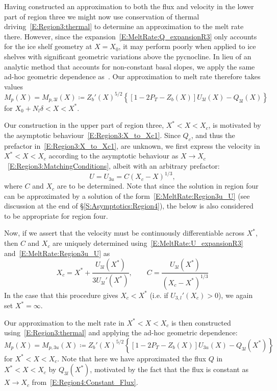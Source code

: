 \documentclass[openacc]{rsproca_new}%
\newcommand{\lt}{\delta} %
\newcommand{\Pt}{\textit{P}_T}
\begin{document}
Having constructed an approximation to both the flux and velocity in the lower part of region three we might now use conservation of thermal driving~\eqref{E:Region3:thermal} to determine an approximation to the melt rate there. However, since the expansion~\eqref{E:MeltRate:Q_expansionR3} only accounts for the ice shelf geometry at $X = X_0$, it may perform poorly when applied to ice shelves with significant geometric variations above the pycnocline. In lieu of an analytic method that accounts for non-constant basal slopes, we apply the same ad-hoc geometric dependence as~\citet{Lazeroms2018TheCryo}. Our approximation to melt rate therefore takes values
\begin{equation}\label{E:MeltRate:regions3_l}
M_{p}(X) = M_{p,3l}(X)\coloneqq Z_b'(X)^{5/2}\left\{\left[1  - 2\Pt -  Z_b(X)\right] U_{3l}(X) - Q_{3l}(X)\right\}
\end{equation}
for $X_0 + N_l \lt < X < X^*$.

Our construction in the upper part of region three, $X^* < X < X_c$, is motivated by the asymptotic behaviour~\eqref{E:Region3:X_to_Xc1}. Since $Q_c$, and thus the prefactor in~\eqref{E:Region3:X_to_Xc1}, are unknown, we first express the velocity in $X^* < X < X_c$ according to the asymptotic behaviour as $X\to X_c$~\eqref{E:Region3:MatchingConditions}, albeit with an arbitrary prefactor:
\begin{equation}\label{E:MeltRate:Region3u_U}
U =U_{3u} =  C (X_c - X)^{1/3},
\end{equation} 
where $C$ and $X_c$ are to be determined. Note that since the solution in region four can be approximated by a solution of the form~\eqref{E:MeltRate:Region3u_U} (see discussion at the end of \S\ref{S:Asymptotics:Region4}), the below is also considered to be appropriate for region four.

Now, if we assert that the velocity must be continuously differentiable across $X^*$, then $C$ and $X_c$ are uniquely determined using~\eqref{E:MeltRate:U_expansionR3} and~\eqref{E:MeltRate:Region3u_U} as
\begin{equation}\label{E:MeltRate:Xc_expression}
X_c = X^* + \frac{U_{3l}(X^*)}{3 U_{3l}'(X^*)}, \qquad C = \frac{U_{3l}(X^*)}{\left(X_c - X^*\right)^{1/3}}
\end{equation}
In the case that this procedure gives $X_c < X^*$ (i.e. if $U_{3,l}'(X_c) > 0$), we again set $X^* = \infty$.

Our approximation to the melt rate in $X^* < X <X_c$ is then constructed using~\eqref{E:Region3:thermal} and applying the ad-hoc geometric dependence:
\begin{equation}\label{E:MeltRate:regions3_u}
M_p(X) = M_{p,3u}(X) \coloneqq Z_b'(X)^{5/2}\left\{ \left[1  - 2\Pt -  Z_b(X)\right] U_{3u}(X) - Q_{3l}(X^*) \right\}
\end{equation}
for $X^* < X < X_c$. Note that here we have approximated the flux $Q$ in $X^* < X < X_c$ by $Q_{3l}(X^*)$, motivated by the fact that the flux is constant as $X \to X_c$ from~\eqref{E:Region4:Constant_Flux}.
\end{document}
